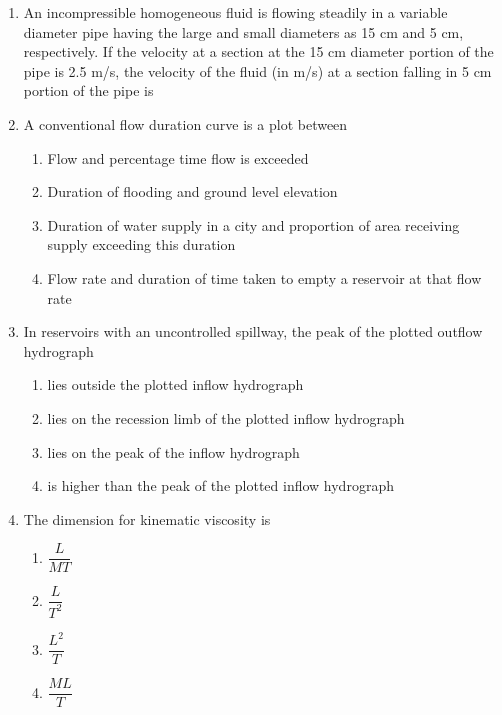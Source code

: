 \documentclass[journal,12pt,onecolumn]{IEEEtran}
\theoremstyle{remark}
\begin{document}
\begin{enumerate}
\item An incompressible homogeneous fluid is flowing steadily in a variable diameter pipe having the large and small diameters as 15 cm and 5 cm, respectively. If the velocity at a section at the 15 cm diameter portion of the pipe is 2.5 m/s, the velocity of the fluid (in m/s) at a section falling in 5 cm portion of the pipe is \hfill{}


\item A conventional flow duration curve is a plot between \hfill{}


\begin{enumerate}
\item Flow and percentage time flow is exceeded
\item Duration of flooding and ground level elevation
\item Duration of water supply in a city and proportion of area receiving supply exceeding this duration
\item Flow rate and duration of time taken to empty a reservoir at that flow rate
\end{enumerate}


\item In reservoirs with an uncontrolled spillway, the peak of the plotted outflow hydrograph \hfill{}


\begin{enumerate}
\item lies outside the plotted inflow hydrograph
\item lies on the recession limb of the plotted inflow hydrograph
\item lies on the peak of the inflow hydrograph
\item is higher than the peak of the plotted inflow hydrograph
\end{enumerate}



\item The dimension for kinematic viscosity is \hfill{}

\begin{multicols}{4}
\begin{enumerate}
\item $\dfrac{L}{MT}$
\item $\dfrac{L}{T^{2}}$
\item $\dfrac{L^2}{T}$
\item $\dfrac{ML}{T}$
\end{enumerate}
\end{multicols}


\end{enumerate}
\end{document}
